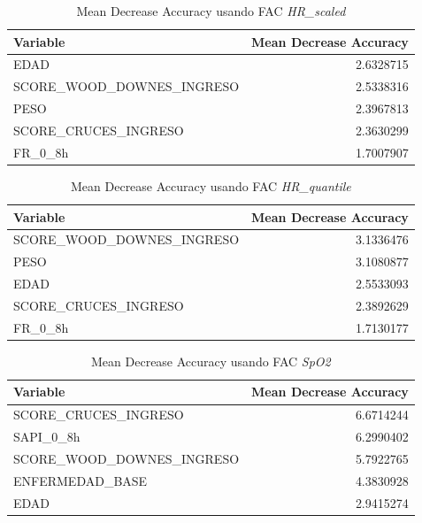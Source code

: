 \begin{table}[H]
    \centering
    \begin{tabular}{lr}
        \toprule
        \textbf{Variable} & \textbf{Mean Decrease Accuracy} \\
        \midrule
        EDAD & 2.6328715 \\
        SCORE\_WOOD\_DOWNES\_INGRESO & 2.5338316 \\
        PESO & 2.3967813 \\
        SCORE\_CRUCES\_INGRESO & 2.3630299 \\
        FR\_0\_8h & 1.7007907 \\
        \bottomrule
    \end{tabular}
    \caption{Mean Decrease Accuracy usando FAC \textit{HR\_scaled}}
\end{table}

\begin{table}[H]
    \centering
    \begin{tabular}{lr}
        \toprule
        \textbf{Variable} & \textbf{Mean Decrease Accuracy} \\
        \midrule
        SCORE\_WOOD\_DOWNES\_INGRESO & 3.1336476 \\
        PESO & 3.1080877 \\
        EDAD & 2.5533093 \\
        SCORE\_CRUCES\_INGRESO & 2.3892629 \\
        FR\_0\_8h & 1.7130177 \\
        \bottomrule
    \end{tabular}
    \caption{Mean Decrease Accuracy usando FAC \textit{HR\_quantile}} 
\end{table}

\begin{table}[H]
    \centering
    \begin{tabular}{lr}
        \toprule
        \textbf{Variable} & \textbf{Mean Decrease Accuracy} \\
        \midrule
        SCORE\_CRUCES\_INGRESO & 6.6714244 \\
        SAPI\_0\_8h & 6.2990402 \\
        SCORE\_WOOD\_DOWNES\_INGRESO & 5.7922765 \\
        ENFERMEDAD\_BASE & 4.3830928 \\
        EDAD & 2.9415274 \\
        \bottomrule
    \end{tabular}
    \caption{Mean Decrease Accuracy usando FAC \textit{SpO2}}
\end{table}

